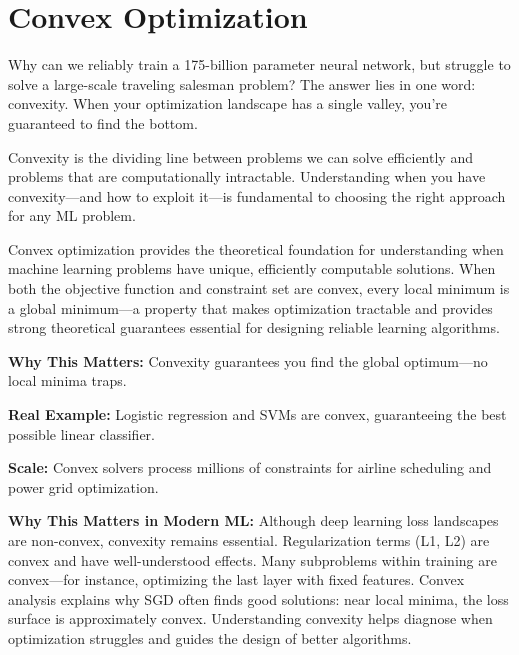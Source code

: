 \documentclass[../../main.tex]{subfiles}
\begin{document}
\chapter{Convex Optimization}
\label{ch:convex-optimization}

Why can we reliably train a 175-billion parameter neural network, but struggle to solve a large-scale traveling salesman problem? The answer lies in one word: convexity. When your optimization landscape has a single valley, you're guaranteed to find the bottom.

\begin{whycare}
Convexity is the dividing line between problems we can solve efficiently and problems that are computationally intractable. Understanding when you have convexity---and how to exploit it---is fundamental to choosing the right approach for any ML problem.
\end{whycare}

\begin{keyconcept}
Convex optimization provides the theoretical foundation for understanding when machine learning problems have unique, efficiently computable solutions. When both the objective function and constraint set are convex, every local minimum is a global minimum---a property that makes optimization tractable and provides strong theoretical guarantees essential for designing reliable learning algorithms.
\end{keyconcept}

\begin{realworld}
\textbf{Why This Matters:} Convexity guarantees you find the global optimum---no local minima traps.

\textbf{Real Example:} Logistic regression and SVMs are convex, guaranteeing the best possible linear classifier.

\textbf{Scale:} Convex solvers process millions of constraints for airline scheduling and power grid optimization.
\end{realworld}

\begin{keyconcept}
\textbf{Why This Matters in Modern ML:}
Although deep learning loss landscapes are non-convex, convexity remains essential. Regularization terms (L1, L2) are convex and have well-understood effects. Many subproblems within training are convex---for instance, optimizing the last layer with fixed features. Convex analysis explains why SGD often finds good solutions: near local minima, the loss surface is approximately convex. Understanding convexity helps diagnose when optimization struggles and guides the design of better algorithms.
\end{keyconcept}
\end{document}
